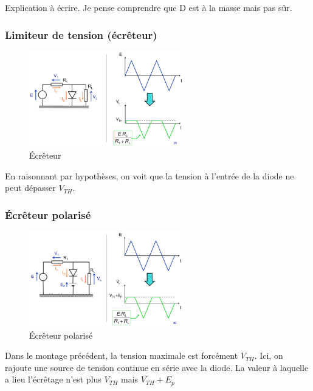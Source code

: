 \documentclass[a4paper]{article}
\begin{document}
    Explication à écrire. Je pense comprendre que D est à la masse mais pas sûr.

    \subsubsection{Limiteur de tension (écrêteur)}
    \begin{figure}[H]
        \begin{center}
            \includegraphics[width=0.6\textwidth]{fig/5_ecreteur.png}
            \caption{\'Ecrêteur}
            \label{fig:5_ecreteur}
        \end{center}
    \end{figure}
    En raisonnant par hypothèses, on voit que la tension à l'entrée de la diode
    ne peut dépasser $V_{TH}$. 

    \subsubsection{\'Ecrêteur polarisé}
    \begin{figure}[H]
        \begin{center}
            \includegraphics[width=0.6\textwidth]{fig/5_ecreteurpolarise.png}
            \caption{\'Ecrêteur polarisé}
            \label{fig:5_ecreteurpolarise}
        \end{center}
    \end{figure}
    Dans le montage précédent, la tension maximale est forcément $V_{TH}$. Ici,
    on rajoute une source de tension continue en série avec la diode. 
    La valeur à laquelle a lieu l'écrêtage n'est plus $V_{TH}$ mais $V_{TH} + E_p$\\
\end{document}
